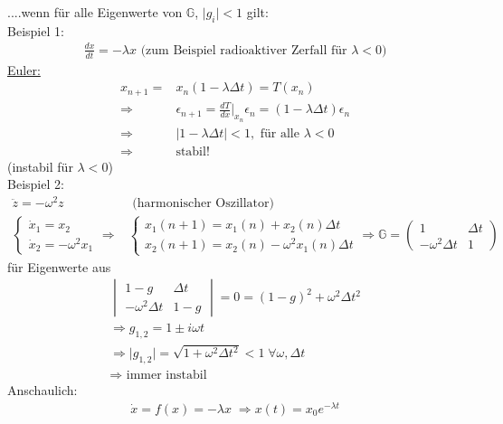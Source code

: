 \documentclass[12pt]{article}
\begin{document}
....wenn für alle Eigenwerte von $\mathbb{G}$, $\vert g_i \vert <1$ gilt:
\\
Beispiel 1: \begin{align}
\frac{dx}{dt}= - \lambda x \mbox{  (zum Beispiel radioaktiver Zerfall für } \lambda<0)
 \end{align}
 \underline{Euler:}
 \begin{align}
 x_{n+1} =& x_n ( 1- \lambda \Delta t) = T (x_n) \\
 \Rightarrow &\epsilon_{n+1} = \frac{dT}{dx} \vert _{x_n} \epsilon_n = (1- \lambda \Delta t) \epsilon_n \\
 \Rightarrow & \vert 1 - \lambda \Delta t \vert <1 , \mbox{  für alle } \lambda < 0 \\
 \Rightarrow & \mbox{stabil!}
 \end{align}
(instabil für $\lambda < 0$) \\
Beispiel 2: \begin{align}
\ddot{z}= - \omega^2 z & \mbox{  (harmonischer Oszillator)} \\
\begin{cases}
\dot{x}_1 = x_2 \\
\dot{x}_2 = - \omega^2 x_1 
\end{cases} 
\Rightarrow &
\begin{cases}
x_1 (n+1) = x_1(n) + x_2 (n) \Delta t \\
x_2 (n+1) = x_2(n) - \omega^2 x_1 (n) \Delta t
\end{cases}
\Rightarrow \mathbb{G} = 
\begin{pmatrix}
 1 & \Delta t \\
 - \omega^2 \Delta t & 1
\end{pmatrix}
\end{align}
für Eigenwerte aus 
\begin{align}
\begin{vmatrix}
1-g & \Delta t \\
- \omega^2 \Delta t & 1-g
\end{vmatrix}
= 0 = (1-g)^2 + \omega^2 \Delta t^2 \\
\Rightarrow g_{1,2} = 1 \pm i\omega t \\
\Rightarrow \vert g_{1,2} \vert = \sqrt{1 + \omega^2 \Delta t^2} <1\; \forall \omega, \Delta t \\
\Rightarrow \mbox{ immer instabil}
\end{align}
Anschaulich: \begin{align}
\dot{x}= f(x) = - \lambda x \; \Rightarrow x(t) = x_0 e^{-\lambda t}
\end{align}
\end{document}
